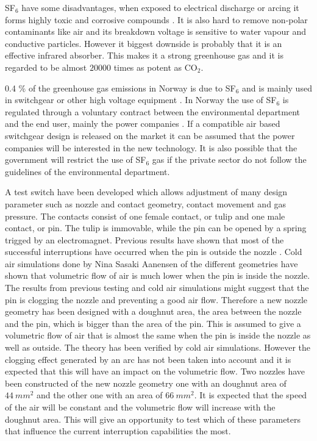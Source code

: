 \documentclass[10pt,a4paper]{article}
\begin{document}
SF$_6$ have some disadvantages, when exposed to electrical discharge or arcing it forms highly toxic and corrosive compounds \cite{bib:SF6PI}. It is also hard to remove non-polar contaminants like air and its breakdown voltage is sensitive to water vapour and conductive particles. However it biggest downside is probably that it is an effective infrared absorber. This makes it a strong greenhouse gas \cite{bib:SF6PI} and it is regarded to be almost $20000$ times as potent as CO$_2$.

0.4 \% of the greenhouse gas emissions in Norway is due to SF$_6$ and is mainly used in switchgear or other high voltage equipment \cite{bib:KlimaKur2020}. In Norway the use of SF$_6$ is regulated through a voluntary contract between the environmental department and the end user, mainly the power companies \cite{bib:KlimaKur2020}. If a compatible air based switchgear design is released on the market it can be assumed that the power companies will be interested in the new technology. It is also possible that the government will restrict the use of SF$_6$ gas if the private sector do not follow the guidelines of the environmental department.

A test switch have been developed which allows adjustment of many design parameter such as nozzle and contact geometry, contact movement and gas pressure. The contacts consist of one female contact, or tulip and one male contact, or pin. The tulip is immovable, while the pin can be opened by a spring trigged by an electromagnet. Previous results have shown that most of the successful interruptions have occurred when the pin is outside the nozzle \cite{bib:CIAMVLBS}. Cold air simulations done by Nina Sasaki Aanensen of the different geometries have shown that volumetric flow of air is much lower when the pin is inside the nozzle. The results from previous testing and cold air simulations might suggest that the pin is clogging the nozzle and preventing a good air flow. Therefore a new nozzle geometry has been designed with a doughnut area, the area between the nozzle and the pin, which is bigger than the area of the pin. This is assumed to give a volumetric flow of air that is almost the same when the pin is inside the nozzle as well as outside. The theory has been verified by cold air simulations. However the clogging effect generated by an arc has not been taken into account and it is expected that this will have an impact on the volumetric flow. Two nozzles have been constructed of the new nozzle geometry one with an doughnut area of $44 \ mm^2$ and the other one with an area of $66 \ mm^2$. It is expected that the speed of the air will be constant and the volumetric flow will increase with the doughnut area. This will give an opportunity to test which of these parameters that influence the current interruption capabilities the most.
\end{document}
